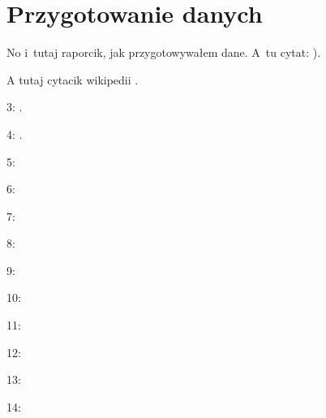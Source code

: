 %		
%
%
%


\chapter{Przygotowanie danych}
\label{cha:przyg.danych}

No i~tutaj raporcik, jak przygotowywałem dane. A~tu cytat: \cite{Santos09}).

A tutaj cytacik wikipedii \cite{wiki:klas.stat}.

3: \cite{Olson85}.

4: \cite{ferrite.meter}.

5: \cite{Babu13}

6: \cite{Saluja15}

7: \cite{Vitek03.I}

8: \cite{Vitek03.II}

9: \cite{Vasudevan13}

10: \cite{Bhadeshia07}

11: \cite{Badmos13}

12: \cite{Nieves09}

13: \cite{Yang16}

14: \cite{Yoseba08}

